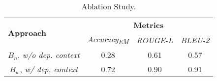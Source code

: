\begin{table}[]
\centering
\begin{tabular}{l|ccc}
\toprule
\multirow{2}{*}{\textbf{Approach}} & \multicolumn{3}{c}{\textbf{Metrics}}                                  \\ \cline{2-4} 
                                   & \multicolumn{1}{c|}{\textit{Accuracy\textsubscript{EM}}} & \multicolumn{1}{c|}{\textit{ROUGE-L}} & \textit{BLEU-2} \\ \hline
\multicolumn{1}{c|}{$B_n$, \textit{w/o dep. context}}      & \multicolumn{1}{c|}{0.28}         & \multicolumn{1}{c|}{0.61}        &  0.57 \\
\multicolumn{1}{c|}{$B_w$, \textit{w/ dep. context}}       & \multicolumn{1}{c|}{0.72}         & \multicolumn{1}{c|}{0.90}        &  0.91 \\ \bottomrule
\end{tabular}
\caption{Ablation Study.}
\label{tab:ablation}
\end{table}